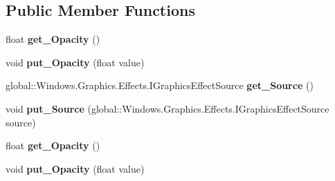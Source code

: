 \subsection*{Public Member Functions}
\begin{DoxyCompactItemize}
\item 
\mbox{\label{interface_microsoft_1_1_graphics_1_1_canvas_1_1_effects_1_1_i_opacity_effect_a5b292a8b09cbc683fee56e57c5fb9e50}} 
float {\bfseries get\+\_\+\+Opacity} ()
\item 
\mbox{\label{interface_microsoft_1_1_graphics_1_1_canvas_1_1_effects_1_1_i_opacity_effect_a869c5377258508b0dc30e395346a3315}} 
void {\bfseries put\+\_\+\+Opacity} (float value)
\item 
\mbox{\label{interface_microsoft_1_1_graphics_1_1_canvas_1_1_effects_1_1_i_opacity_effect_a77e279b93897a71f5fc330abc90056d4}} 
global\+::\+Windows.\+Graphics.\+Effects.\+I\+Graphics\+Effect\+Source {\bfseries get\+\_\+\+Source} ()
\item 
\mbox{\label{interface_microsoft_1_1_graphics_1_1_canvas_1_1_effects_1_1_i_opacity_effect_a9ea7803e3e9d075e3baa03719edd7a57}} 
void {\bfseries put\+\_\+\+Source} (global\+::\+Windows.\+Graphics.\+Effects.\+I\+Graphics\+Effect\+Source source)
\item 
\mbox{\label{interface_microsoft_1_1_graphics_1_1_canvas_1_1_effects_1_1_i_opacity_effect_a5b292a8b09cbc683fee56e57c5fb9e50}} 
float {\bfseries get\+\_\+\+Opacity} ()
\item 
\mbox{\label{interface_microsoft_1_1_graphics_1_1_canvas_1_1_effects_1_1_i_opacity_effect_a869c5377258508b0dc30e395346a3315}} 
void {\bfseries put\+\_\+\+Opacity} (float value)
\item 
\mbox{\label{interface_microsoft_1_1_graphics_1_1_canvas_1_1_effects_1_1_i_opacity_effect_a77e279b93897a71f5fc330abc90056d4}} 

\end{DoxyCompactItemize}
